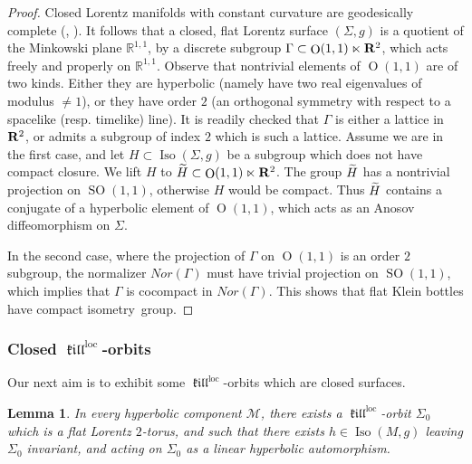\documentclass[11pt]{article}
\newtheorem{lemm}[theo]{Lemma}
\theoremstyle{definition}
\numberwithin{equation}{section}
\numberwithin{figure}{section}
\numberwithin{table}{section}
\DeclareMathOperator{\Iso}{Iso}
\DeclareMathOperator{\SO}{SO}
\DeclareMathOperator{\Omp}{O}%
\DeclareMathOperator{\loc}{loc}
\DeclareMathOperator{\kil}{{\mathfrak{kill}}}
\newcommand{\kiloc}{\kil^{\loc}}
\newcommand*\RR{\mathbb{R}}
\newcommand{\R}{{\bf R}}
\let\oldtilde\tilde
\renewcommand*\tilde[1]{\mathchoice{\widetilde{#1}}{\widetilde{#1}}{\widetilde{#1}}{\oldtilde{#1}}}
\begin{document}
\begin{proof}
Closed Lorentz manifolds with constant curvature are geodesically complete (\cite{carriere}, \cite{klingler}). It follows that a closed, flat Lorentz surface $(\Sigma, g)$ is a quotient of the Minkowski plane $\RR^{1,1}$, by a discrete subgroup $\Gamma \subset \Omp(1,1) \ltimes \R^2$, which acts freely and properly on $\RR^{1,1}$. Observe that nontrivial elements of $\Omp(1,1) $ are of two kinds. Either they are hyperbolic (namely have two real eigenvalues of modulus $\not = 1$), or they have order $2$ (an orthogonal symmetry with respect to a spacelike (resp. timelike) line). It is readily checked that $\Gamma$ is either a lattice in $\R^2$, or admits a subgroup of index $2$ which is such a lattice. Assume we are in the first case, and let $H \subset \Iso(\Sigma,g)$ be a subgroup which does not have compact closure. We lift $H$ to $\tilde{H} \subset \Omp(1,1) \ltimes \R^2$. The group $\tilde{H}$ has a nontrivial projection on $\SO(1,1)$, otherwise $H$ would be compact. Thus $\tilde{H}$ contains a conjugate of a hyperbolic element of $\Omp(1,1)$, which acts as an Anosov diffeomorphism on $\Sigma$.

In the second case, where the projection of $\Gamma$ on $\Omp(1,1)$ is an order $2$ subgroup, the normalizer $Nor(\Gamma)$ must have trivial projection on $\SO(1,1)$, which implies that $\Gamma$ is cocompact in $Nor(\Gamma)$. This shows that flat Klein bottles have compact isometry~group.
\end{proof}



\subsubsection{Closed \texorpdfstring{$\kiloc$}{kiloc}-orbits} Our next aim is to exhibit some $\kiloc$-orbits which are closed surfaces.

\begin{lemm}\label{lem.anosov.tore}
In every hyperbolic component ${\mathcal M}$, there exists a $\kiloc$-orbit $\Sigma_0$ which is a flat Lorentz $2$-torus, and such that there exists $h \in \Iso(M,g)$ leaving $\Sigma_0$ invariant, and acting on $\Sigma_0$ as a linear hyperbolic automorphism.
\end{lemm}
\end{document}

